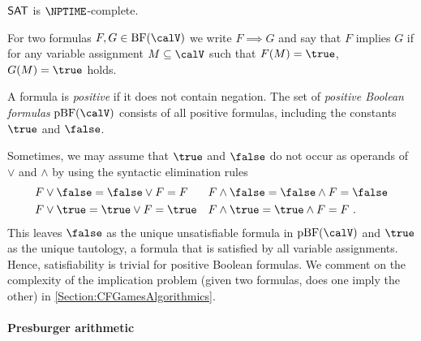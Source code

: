 \documentclass[../../diss.tex]{subfiles}
\begin{document}
\begin{problem}
    \problemshort{($\SAT$)}
\end{problem}

\begin{ntheorem}
    $\SAT$ is $\NPTIME$-complete.
\end{ntheorem}


For two formulas $F,G \in \BF(\vars)$ we write $F \implies G$ and say that $F$ implies $G$ if for any variable assignment $M \subseteq \vars$ such that $F(M) = \true$, $G(M) = \true$ holds.


A formula is \emph{positive} if it does not contain negation.
The set of \emph{positive Boolean formulas} $\pBF(\vars)$ consists of all positive formulas, including the constants $\true$ and $\false$.

Sometimes, we may assume that $\true$ and $\false$ do not occur as operands of $\vee$ and $\wedge$ by using the syntactic elimination rules
%
\begin{align*}
    &F \vee \false = \false \vee F = F
    &
    &F \wedge \false = \false \wedge F = \false
    \\
    &F \vee \true = \true \vee F = \true
    &
    &F \wedge \true = \true \wedge F = F
    \ .
\end{align*}
%
This leaves $\false$ as the unique unsatisfiable formula in $\pBF(\vars)$ and $\true$ as the unique tautology, \ie a formula that is satisfied by all variable assignments.
Hence, satisfiability is trivial for positive Boolean formulas.
We comment on the complexity of the implication problem (given two formulas, does one imply the other) in \cref{Section:CFGamesAlgorithmics}.

\paragraph{Presburger arithmetic}
\end{document}
